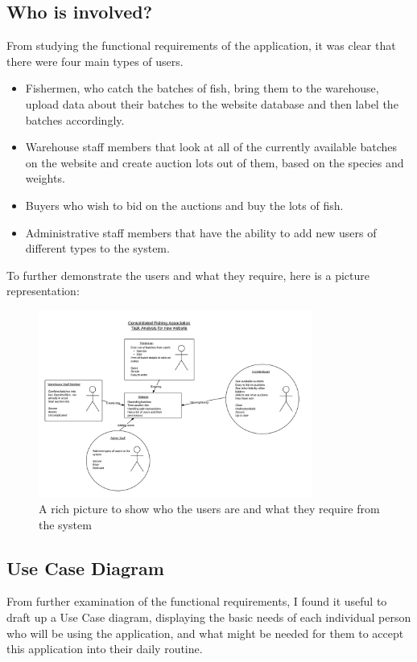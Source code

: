 \documentclass{article}
\begin{document}
\subsection{Who is involved?}
From studying the functional requirements of the application, it was clear that there were four main types of users.
\begin{itemize}
\item Fishermen, who catch the batches of fish, bring them to the warehouse, upload data about their batches to the website database and then label the batches accordingly.
\item Warehouse staff members that look at all of the currently available batches on the website and create auction lots out of them, based on the species and weights.
\item Buyers who wish to bid on the auctions and buy the lots of fish.
\item Administrative staff members that have the ability to add new users of different types to the system.
\end{itemize}

To further demonstrate the users and what they require, here is a picture representation:
\begin{figure}[H]
	\centering
	\includegraphics[width=0.8\textwidth]{img/TA-RP1.png}
	\caption{A rich picture to show who the users are and what they require from the system}
\end{figure}
\subsection{Use Case Diagram}
From further  examination of the functional requirements, I found it useful to draft up a Use Case diagram, displaying the basic needs of each individual person who will be using the application, and what might be needed for them to accept this application into their daily routine.
\end{document}
